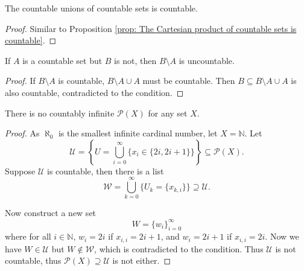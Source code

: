 \begin{proposition}
	\label{prop: The countable union of countable sets is countable}
    The countable unions of countable sets is countable.
    
    \begin{proof}
        Similar to Proposition \ref{prop: The Cartesian product of countable sets is countable}.
    \end{proof}
\end{proposition}


\begin{proposition}
    If $A$ is a countable set but $B$ is not, then $B \setminus A$ is uncountable.

    \begin{proof}
        If $B \setminus A$ is countable, $B \setminus A \cup A$ must be countable. Then $B \subseteq B \setminus A \cup A$ is also countable, contradicted to the condition.
    \end{proof}
\end{proposition}


\begin{proposition}
	\label{prop: there is no  countably infinite power set}
	There is no countably infinite $\mathcal P(X)$ for any set $X$.
	
	\begin{proof}
		As $\aleph_0$ is the smallest infinite cardinal number, let $X = \mathbb N$. Let
		$$
		\mathcal U = \left\{ U = \bigcup_{i=0}^\infty \{ x_i \in \{2i, 2i + 1\} \} \right\} \subseteq \mathcal P(X).
		$$
		Suppose $\mathcal U$ is countable, then there is a list
		$$
		\mathcal W = \bigcup_{k = 0}^{\infty} \{U_k = \{x_{k,i}\} \} \supseteq \mathcal U.
		$$
		
		Now construct a new set
		$$
		W = \{ w_i \}_{i = 0}^\infty
		$$
		where for all $i \in \mathbb N$, $w_{i} = 2i$ if $x_{i,i} = 2i + 1$, and $w_i = 2i + 1$ if $x_{i,i} = 2i$. Now we have $W \in \mathcal U$ but $W \notin \mathcal W$, which is contradicted to the condition. Thus $\mathcal U$ is not countable, thus $\mathcal P(X) \supseteq \mathcal U$ is not either.
	\end{proof}
\end{proposition}


